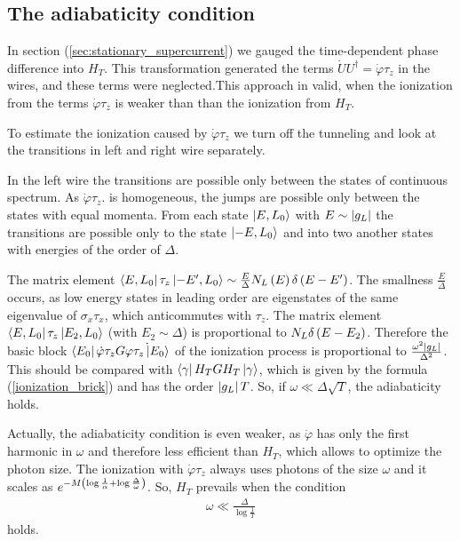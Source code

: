 \subsection{The adiabaticity condition}
In section (\ref{sec:stationary_supercurrent}) we gauged the time-dependent phase difference into $ H_T $. This transformation generated the terms $ \dot{U}U^\dagger=\dot{\varphi}\tau_z $ in the wires, and these terms were neglected.This approach in valid, when the ionization from the terms $  \dot{\varphi}\tau_z $ is weaker than than the ionization from $ H_T$.

To estimate the ionization caused by $ \dot{\varphi}\tau_z $ we turn off the tunneling  and look at the transitions in left and right wire separately.

In the left wire the transitions are possible only between the states of continuous spectrum. As $ \dot{\varphi}\tau_z. $ is homogeneous, the jumps are possible only between the states with equal momenta. From each state $ \ket{E,L_0} $ with $ E\sim\left|g_L\right| $ the transitions are possible only to the state $ \ket{-E,L_0} $ and into two another states with energies of the order of $ \Delta $.

  The matrix element $ \bra{E,L_0}\tau_z\ket{-E', L_0} \sim\frac{E}{\Delta}
  N_L\left(E\right)\delta\left(E-E'\right)$. The smallness $ \frac{E}{\Delta} $ occurs, as low energy states in leading order are eigenstates  of the same eigenvalue of $ \sigma_x\tau_x $, which anticommutes with $ \tau_z $. The matrix element $ \bra{E,L_0}\tau_z\ket{E_2, L_0}$ (with $ E_2\sim \Delta $) is proportional to $ N_L \delta\left(E-E_2\right) $. Therefore the basic block $ \bra{E_0}\dot{\varphi}\tau_zG\dot{\varphi\tau_z\ket{E_0}}$ of the ionization process is proportional to $ \frac{\omega^2\left|g_L\right|}{\Delta^2} $. This should be compared with $ \bra{\gamma}H_T G H_T \ket{\gamma}$, which is given by the formula (\ref{ionization_brick}) and has the order $ \left|g_L\right|T $. So, if $ \omega\ll\Delta\sqrt{T} $, the adiabaticity holds.
  
  Actually, the adiabaticity condition is even weaker, as $ \dot{\varphi} $ has only the first harmonic in $ \omega $  and therefore less efficient than $ H_T $, which allows to optimize the photon size. The ionization with $ \dot{\varphi}\tau_z $ always uses photons of the size $ \omega $ and it scales as $ e^{-M\left(\log\frac{1}{\alpha}+\log\frac{\Delta}{\omega}\right)} $. So, $ H_T $ prevails when the condition
  \begin{gather}
  \omega
  	\ll \frac{\Delta}{\log\frac{1}{T}}
  \end{gather}
  holds.
  
